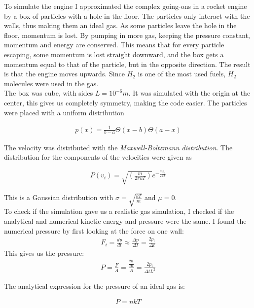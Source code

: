 \documentclass[a4paper, 10pt]{article}
\begin{document}
To simulate the engine I approximated the complex going-ons in a rocket engine by a box of particles with a hole in the floor. The particles only interact with the walls, thus making them an ideal gas. As some particles leave the hole in the floor, momentum is lost. By pumping in more gas, keeping the pressure constant, momentum and energy are conserved. This means that for every particle escaping, some momentum is lost straight downward, and the box gets a momentum equal to that of the particle, but in the opposite direction. The result is that the engine moves upwards. Since $H_2$ is one of the most used fuels, $H_2$ molecules were used in the gas.\\

The box was cube, with sides $L = 10^{-6}m$. It was simulated with the origin at the center, this gives us completely symmetry, making the code easier. The particles were placed with a uniform distribution 

\begin{align}
p(x) = \frac{1}{b-a}\Theta(x-b)\Theta(a-x)
\end{align}

The velocity was distributed with the \textit{Maxwell-Boltzmann distribution}. The distribution for the components of the velocities were given as \cite{1a}

\begin{align}
P(v_i) = \sqrt{\left( \frac{m}{2 \pi k T} \right)} e^{-\frac{m v_i}{2kT}}
\end{align}

This is a Gaussian distribution with $\sigma = \sqrt{ \frac{kT}{m}}$
and $\mu = 0$.\\

To check if the simulation gave us a realistic gas simulation, I checked if the analytical and numerical kinetic energy and pressure were the same. I found the numerical pressure by first looking at the force on one wall:
\begin{align}
F_i = \frac{dp}{dt} \approx \frac{\Delta p}{\Delta t} = \frac{2p_i}{\Delta t}
\end{align}
This gives us the pressure:
\begin{align}
P = \frac{F}{A} = \frac{\frac{2p_i}{\Delta t}}{A} = \frac{2p_i}{\Delta t L^{2}}
\end{align}

The analytical expression for the pressure of an ideal gas is:

\begin{align}
P = nkT
\end{align}
\end{document}
